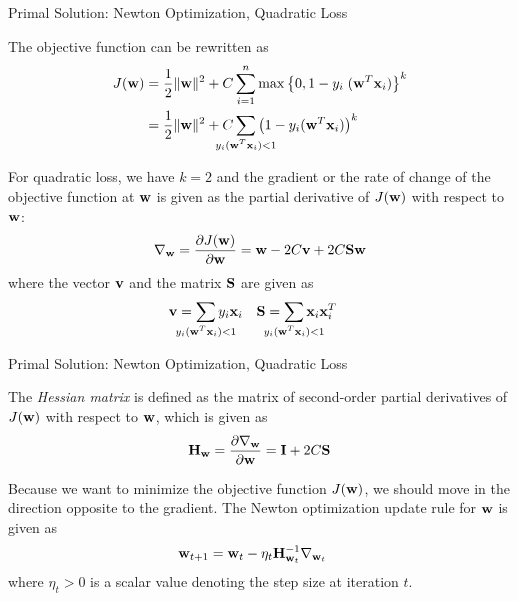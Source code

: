 \begin{frame}{Primal Solution: Newton Optimization, Quadratic Loss}

  The objective function can be rewritten as
\begin{align*}
    J(\bw) & = \frac{1}{2} \| \bw \|^2 +
    C \dsum_{i=1}^n  \max\lB\{0, 1-y_i \; (\bw^T\bx_i)\rB\}^k\notag\\
    & = \frac{1}{2} \| \bw \|^2 +
    C \dsum_{\mathclap{y_i(\bw^T\bx_i)<1}} \lB(1 - y_i (\bw^T\bx_i)\rB)^k
\end{align*}

  For quadratic loss, we have $k=2$ and 
  the gradient or the rate of change of the objective function at
$\mathbf{w}$ is given as the partial derivative of $J(\mathbf{w})$ with respect
to $\mathbf{w}$:
\begin{align*}
    \nabla_{\mathbf{w}} = {\partial J(\mathbf{w}) \over \partial \mathbf{w}}
 = \mathbf{w} - 2C \mathbf{v} + 2C \mathbf{S} \mathbf{w}
\end{align*}
where the vector $\mathbf{v}$ and the matrix $\mathbf{S}$ are given as
\begin{align*}
    \bv & =\dsum_{\mathclap{y_i(\bw^T\bx_i)<1}} y_i \bx_i &
\bS &= \dsum_{\mathclap{y_i(\bw^T\bx_i)<1}} \bx_i \bx_i^T
\end{align*}
\end{frame}



\begin{frame}{Primal Solution: Newton Optimization, Quadratic Loss}

The {\em Hessian matrix} is
def\/{i}ned as the matrix of second-order
partial derivatives of $J(\mathbf{w})$ with respect to $\mathbf{w}$,
which is given as
\begin{align*}
    \mathbf{H}_{\mathbf{w}} = {\partial \nabla_{\mathbf{w}} \over \partial \mathbf{w}} = \mathbf{I} +
    2C\mathbf{S}
\end{align*}

\medskip
Because we want to minimize the objective function $J(\mathbf{w})$, we
should move in the direction opposite to the gradient. The Newton
optimization update rule for $\mathbf{w}$ is given as
\begin{align*}
    \mathbf{w}_{t+1} & = \mathbf{w}_t - \eta_t \mathbf{H}_{\mathbf{w}_t}^{-1} \nabla_{\mathbf{w}_t}
\end{align*}
where $\eta_t > 0$ is a scalar value denoting the step size at
iteration $t$. 

\end{frame}



